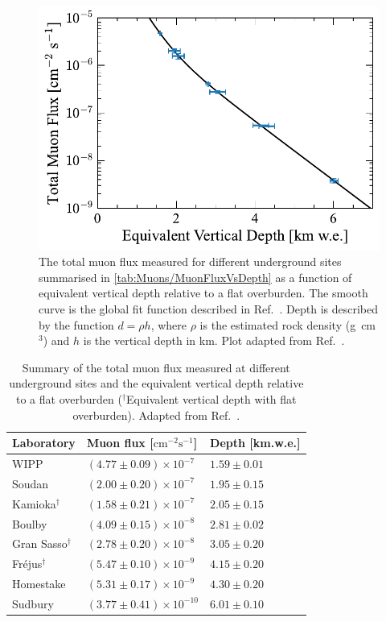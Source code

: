 \begin{figure}[h!]
    \centering
    \includegraphics[width=0.7\linewidth]{figures/Muons/Flux_Depth_Plot.pdf}
    \caption[The total muon flux measured for different underground sites.]{The total muon flux measured for different underground sites summarised in \autoref{tab:Muons/MuonFluxVsDepth} as a function of equivalent vertical depth relative to a flat overburden. The smooth curve is the global fit function described in Ref.~\cite{Woodley:2024eln}. Depth is described by the function $d=\rho h$, where $\rho$ is the estimated rock density (g~cm$^3$) and $h$ is the vertical depth in km. Plot adapted from Ref.~\cite{Woodley:2024eln}.}
    \label{fig:Muons/MuonFluxVsDepth}
\end{figure}

\begin{table}[h!]
    \centering
    \caption[Summary of the total muon flux measured at different underground sites and the equivalent vertical depth relative to a flat overburden.]{Summary of the total muon flux measured at different underground sites and the equivalent vertical depth relative to a flat overburden ($^\dagger$Equivalent vertical depth with flat overburden). Adapted from Ref.~\cite{Woodley:2024eln}.}
    \label{tab:Muons/MuonFluxVsDepth}
    \begin{tabular}{lll}
        \hline\hline
        \textbf{Laboratory} & \textbf{Muon flux [$\text{cm}^{-2}\text{s}^{-1}$]}&\textbf{Depth [km.w.e.]}\\
        \hline
        WIPP & $(4.77 \pm 0.09) \times 10^{-7}$ & $1.59 \pm 0.01$ \\
        Soudan & $(2.00 \pm 0.20) \times 10^{-7}$ & $1.95 \pm 0.15$ \\
        Kamioka$^\dagger$ & $(1.58 \pm 0.21) \times 10^{-7}$ & $2.05 \pm 0.15$ \\
        Boulby & $(4.09 \pm 0.15) \times 10^{-8}$ & $2.81 \pm 0.02$ \\
        Gran Sasso$^\dagger$& $(2.78 \pm 0.20) \times 10^{-8}$ & $3.05 \pm 0.20$ \\
        Fréjus$^\dagger$ & $(5.47 \pm 0.10) \times 10^{-9}$ & $4.15 \pm 0.20$ \\
        Homestake & $(5.31 \pm 0.17) \times 10^{-9}$ & $4.30 \pm 0.20$ \\
        Sudbury & $(3.77 \pm 0.41) \times 10^{-10}$ & $6.01 \pm 0.10$ \\
        \hline\hline
    \end{tabular}
\end{table}

